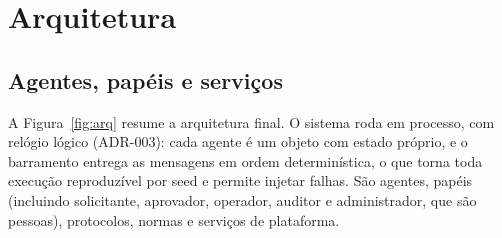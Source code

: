 \documentclass[10pt,a4paper]{article}
\begin{document}
\section{Arquitetura}
\subsection{Agentes, papéis e serviços}
A Figura~\ref{fig:arq} resume a arquitetura final. O sistema roda em processo, com relógio lógico (ADR-003): cada
agente é um objeto com estado próprio, e o barramento entrega as mensagens em ordem determinística, o que torna toda
execução reproduzível por seed e permite injetar falhas. São  agentes,  papéis
(incluindo solicitante, aprovador, operador, auditor e administrador, que são pessoas), 
protocolos,  normas e  serviços de plataforma.
\end{document}
